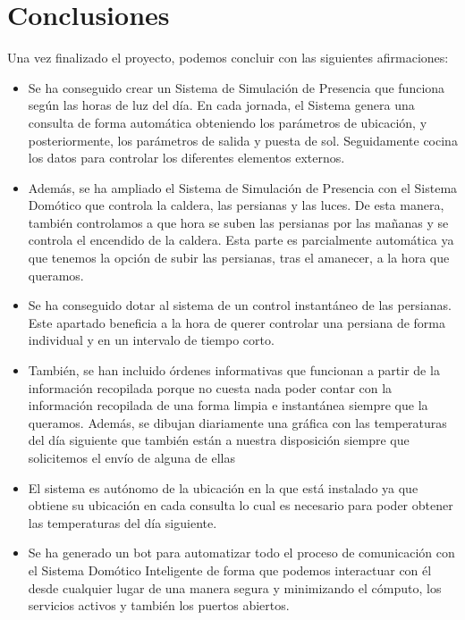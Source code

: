 \section{Conclusiones}
Una vez finalizado el proyecto, podemos concluir con las siguientes afirmaciones:
\begin{itemize}
\item Se ha conseguido crear un Sistema de Simulación de Presencia que funciona según las horas de luz del día. En cada jornada, el Sistema genera una consulta de forma automática obteniendo los parámetros de ubicación, y posteriormente, los parámetros de salida y puesta de sol. Seguidamente cocina los datos para controlar los diferentes elementos externos.

\item Además, se ha ampliado el Sistema de Simulación de Presencia con el Sistema Domótico que controla la caldera, las persianas y las luces. De esta manera, también controlamos a que hora se suben las persianas por las mañanas y se controla el encendido de la caldera. Esta parte es parcialmente automática ya que tenemos la opción de subir las persianas, tras el amanecer, a la hora que queramos.

\item Se ha conseguido dotar al sistema de un control instantáneo de las persianas. Este apartado beneficia a la hora de querer controlar una persiana de forma individual y en un intervalo de tiempo corto.

\item También, se han incluido órdenes informativas que funcionan a partir de la información recopilada porque no cuesta nada poder contar con la información recopilada de una forma limpia e instantánea siempre que la queramos. Además, se dibujan diariamente una gráfica con las temperaturas del día siguiente que también están a nuestra disposición siempre que solicitemos el envío de alguna de ellas

\item El sistema es autónomo de la ubicación en la que está instalado ya que obtiene su ubicación en cada consulta lo cual es necesario para poder obtener las temperaturas del día siguiente.

\item Se ha generado un bot para automatizar todo el proceso de comunicación con el Sistema Domótico Inteligente de forma que podemos interactuar con él desde cualquier lugar de una manera segura y minimizando el cómputo, los servicios activos y también los puertos abiertos.


\end{itemize}
